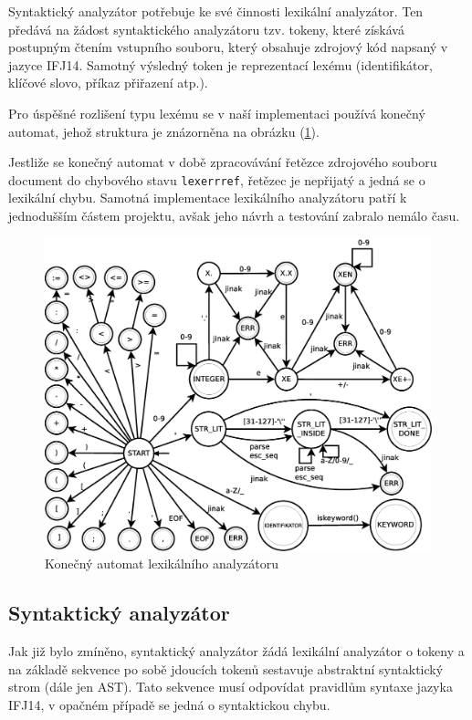 \documentclass[12pt,a4paper,titlepage,final]{article}
\begin{document}
Syntaktický analyzátor potřebuje ke své činnosti lexikální analyzátor. Ten
předává na žádost syntaktického analyzátoru tzv. tokeny, které získává postupným
čtením vstupního souboru, který obsahuje zdrojový kód napsaný v jazyce IFJ14.
Samotný výsledný token je reprezentací lexému (identifikátor, klíčové slovo,
příkaz přiřazení atp.).

Pro úspěšné rozlišení typu lexému se v naší implementaci používá konečný
automat, jehož struktura je znázorněna na obrázku (\ref{lex_ka}).

Jestliže se konečný automat v době zpracovávání řetězce zdrojového souboru
document do chybového stavu \verb|lexerrref|, řetězec je nepřijatý a jedná se
o lexikální chybu. Samotná implementace lexikálního analyzátoru patří k
jednodušším částem projektu, avšak jeho návrh a testování zabralo nemálo času.

\begin{figure}\label{lex_ka}
	\centering
		\includegraphics[width=\linewidth]{../KA-scanner.eps}
	\caption{Konečný automat lexikálního analyzátoru}
\end{figure}

\subsection{Syntaktický analyzátor} \label{syntakticky_analyzator}
Jak již bylo zmíněno, syntaktický analyzátor žádá lexikální analyzátor o tokeny
a na základě sekvence po sobě jdoucích tokenů sestavuje abstraktní syntaktický
strom (dále jen AST). Tato sekvence musí odpovídat pravidlům syntaxe jazyka IFJ14,
v opačném případě se jedná o syntaktickou chybu.
\end{document}
